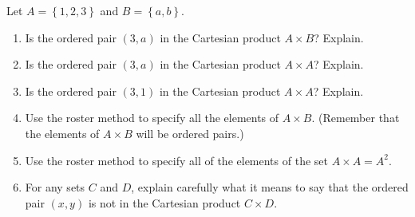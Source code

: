 \begin{previewactivity}
\noindent
Let $A = \left\{ {1,2,3} \right\}$ and  $B = \left\{ {a,b} \right\}$.

\begin{enumerate}
\item Is the ordered pair  $\left( {3,a} \right)$ in the Cartesian product  $A \times B$?  Explain.

\item Is the ordered pair  $\left( {3,a} \right)$ in the Cartesian product $A \times A$?  Explain.

\item Is the ordered pair  $\left( {3,1} \right)$ in the Cartesian product  $A \times A$?  Explain.

\item Use the roster method to specify all the elements of  $A \times B$.  (Remember that the elements of $A \times B$ will be ordered pairs.)

\item Use the roster method to specify all of the elements of the set  $A \times A = A^2$.

\item For any sets  $C$  and  $D$, explain carefully what it means to say that the ordered pair  $\left( {x,y} \right)$ is not in the Cartesian product  $C \times D$.

\end{enumerate}
\end{previewactivity}
\hbreak

\endinput

